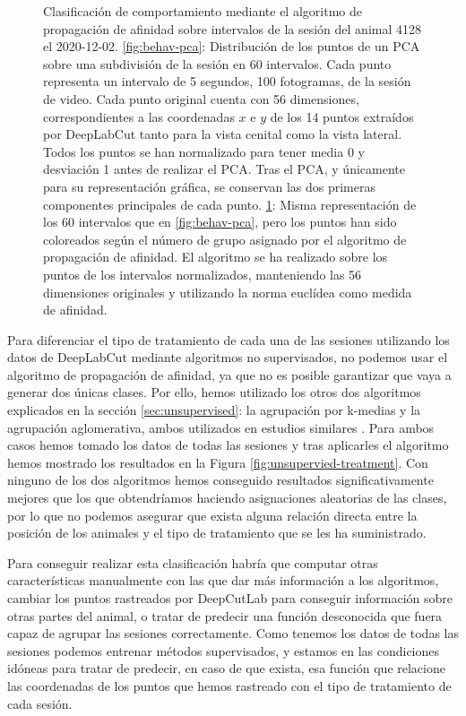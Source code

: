 \begin{figure}[h]
\begin{subfigure}{0.45\textwidth}
    \caption{}
    \label{fig:behav-aff}
  \end{subfigure}
  \caption[Clasificación no supervisada de comportamiento.]{Clasificación de comportamiento mediante el algoritmo de propagación de afinidad sobre intervalos de la sesión del animal 4128 el 2020-12-02. \ref{fig:behav-pca}: Distribución de los puntos de un PCA sobre una subdivisión de la sesión en 60 intervalos. Cada punto representa un intervalo de 5 segundos, 100 fotogramas, de la sesión de video. Cada punto original cuenta con 56 dimensiones, correspondientes a las coordenadas $ x $ e $ y $ de los 14 puntos extraídos por DeepLabCut tanto para la vista cenital como la vista lateral. Todos los puntos se han normalizado para tener media 0 y desviación 1 antes de realizar el PCA. Tras el PCA, y únicamente para su representación gráfica, se conservan las dos primeras componentes principales de cada punto. \ref{fig:behav-aff}: Misma representación de los 60 intervalos que en \ref{fig:behav-pca}, pero los puntos han sido coloreados según el número de grupo asignado por el algoritmo de propagación de afinidad. El algoritmo se ha realizado sobre los puntos de los intervalos normalizados, manteniendo las 56 dimensiones originales y utilizando la norma euclídea como medida de afinidad.}
  \label{fig:unsupervied-behav}
\end{figure}

Para diferenciar el tipo de tratamiento de cada una de las sesiones utilizando los datos de DeepLabCut mediante algoritmos no supervisados, no podemos usar el algoritmo de propagación de afinidad, ya que no es posible garantizar que vaya a generar dos únicas clases. Por ello, hemos utilizado los otros dos algoritmos explicados en la sección \ref{sec:unsupervised}: la agrupación por k-medias y la agrupación aglomerativa, ambos utilizados en estudios similares \cite{frontiers}. Para ambos casos hemos tomado los datos de todas las sesiones y tras aplicarles el algoritmo hemos mostrado los resultados en la Figura \ref{fig:unsupervied-treatment}. Con ninguno de los dos algoritmos hemos conseguido resultados significativamente mejores que los que obtendríamos haciendo asignaciones aleatorias de las clases, por lo que no podemos asegurar que exista alguna relación directa entre la posición de los animales y el tipo de tratamiento que se les ha suministrado.

Para conseguir realizar esta clasificación habría que computar otras características manualmente con las que dar más información a los algoritmos, cambiar los puntos rastreados por DeepCutLab para conseguir información sobre otras partes del animal, o tratar de predecir una función desconocida que fuera capaz de agrupar las sesiones correctamente. Como tenemos los datos de todas las sesiones podemos entrenar métodos supervisados, y estamos en las condiciones idóneas para tratar de predecir, en caso de que exista, esa función que relacione las coordenadas de los puntos que hemos rastreado con el tipo de tratamiento de cada sesión.

